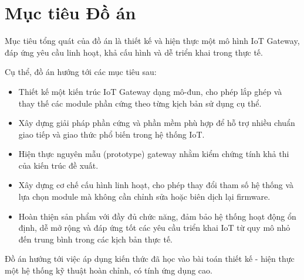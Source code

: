 \section{Mục tiêu Đồ án}
    Mục tiêu tổng quát của đồ án là thiết kế và hiện thực một mô hình IoT Gateway, đáp ứng yêu cầu linh hoạt, khả cấu hình và dễ triển khai trong thực tế.

    Cụ thể, đồ án hướng tới các mục tiêu sau:
    \begin{itemize}
        \item Thiết kế một kiến trúc IoT Gateway dạng mô-đun, cho phép lắp ghép và thay thế các module phần cứng theo từng kịch bản sử dụng cụ thể.
        \item Xây dựng giải pháp phần cứng và phần mềm phù hợp để hỗ trợ nhiều chuẩn giao tiếp và giao thức phổ biến trong hệ thống IoT.
        \item Hiện thực nguyên mẫu (prototype) gateway nhằm kiểm chứng tính khả thi của kiến trúc đề xuất.
        \item Xây dựng cơ chế cấu hình linh hoạt, cho phép thay đổi tham số hệ thống và lựa chọn module mà không cần chỉnh sửa hoặc biên dịch lại firmware.
        \item Hoàn thiện sản phẩm với đầy đủ chức năng, đảm bảo hệ thống hoạt động ổn định, dễ mở rộng và đáp ứng tốt các yêu cầu triển khai IoT từ quy mô nhỏ đến trung bình trong các kịch bản thực tế.
    \end{itemize}

    Đồ án hướng tới việc áp dụng kiến thức đã học vào bài toán thiết kế - hiện thực một hệ thống kỹ thuật hoàn chỉnh, có tính ứng dụng cao.
